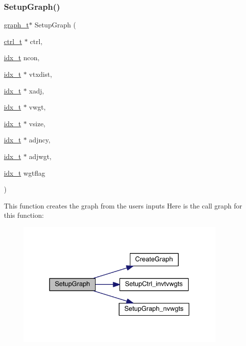 \subsubsection{\texorpdfstring{Setup\+Graph()}{SetupGraph()}}
{\footnotesize\ttfamily \hyperlink{a00734}{graph\+\_\+t}$\ast$ Setup\+Graph (\begin{DoxyParamCaption}\item[{\hyperlink{a00742}{ctrl\+\_\+t} $\ast$}]{ctrl,  }\item[{\hyperlink{a00876_aaa5262be3e700770163401acb0150f52}{idx\+\_\+t}}]{ncon,  }\item[{\hyperlink{a00876_aaa5262be3e700770163401acb0150f52}{idx\+\_\+t} $\ast$}]{vtxdist,  }\item[{\hyperlink{a00876_aaa5262be3e700770163401acb0150f52}{idx\+\_\+t} $\ast$}]{xadj,  }\item[{\hyperlink{a00876_aaa5262be3e700770163401acb0150f52}{idx\+\_\+t} $\ast$}]{vwgt,  }\item[{\hyperlink{a00876_aaa5262be3e700770163401acb0150f52}{idx\+\_\+t} $\ast$}]{vsize,  }\item[{\hyperlink{a00876_aaa5262be3e700770163401acb0150f52}{idx\+\_\+t} $\ast$}]{adjncy,  }\item[{\hyperlink{a00876_aaa5262be3e700770163401acb0150f52}{idx\+\_\+t} $\ast$}]{adjwgt,  }\item[{\hyperlink{a00876_aaa5262be3e700770163401acb0150f52}{idx\+\_\+t}}]{wgtflag }\end{DoxyParamCaption})}

This function creates the graph from the user\textquotesingle{}s inputs Here is the call graph for this function\+:\nopagebreak
\begin{figure}[H]
\begin{center}
\leavevmode
\includegraphics[width=294pt]{a00852_a010e2ad3dd68ae816d481fdcd4260583_cgraph}
\end{center}
\end{figure}
\mbox{\label{a00852_adc4ae6f6575afd6ae777f535ea8c439f}} 
